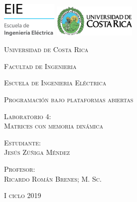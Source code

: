 \begin{titlepage}
		\bf
		\centering
		\includegraphics[width=0.20\textwidth]{images/EIE.png}			
		\hspace{7cm} 
		\includegraphics[width=0.30\textwidth]{images/UCR.png}	
		\par
		\vspace{2cm}			
		{\scshape\large Universidad de Costa Rica \par}
		\vspace{0.6cm}
		{\scshape\large Facultad de Ingenieria\par}
		\vspace{0.6cm}
		{\scshape\large Escuela de Ingenieria Eléctrica\par}
		\vspace{0.6cm}
		{\scshape\large Programación bajo plataformas abiertas\par}
		\vspace{1.5cm}		
		{\scshape\large Laboratorio 4:\\ Matrices con memoria dinámica \par}
		\vspace{2.5cm}		
		{\scshape\large Estudiante:\\ Jesús Zúñiga Méndez \par}
		\vspace{2.5cm}		
		{\scshape\large Profesor:\\ Ricardo Román Brenes; M. Sc. \par}
		\vspace{2.5cm}
		{\scshape\large I ciclo 2019 \par}
\end{titlepage}

